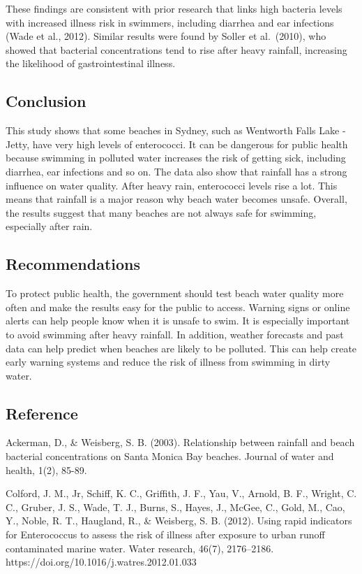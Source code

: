 \documentclass[
  11pt,
]{article}
\begin{document}
These findings are consistent with prior research that links high
bacteria levels with increased illness risk in swimmers, including
diarrhea and ear infections (Wade et al., 2012). Similar results were
found by Soller et al.~(2010), who showed that bacterial concentrations
tend to rise after heavy rainfall, increasing the likelihood of
gastrointestinal illness.

\subsection{Conclusion}\label{conclusion}

This study shows that some beaches in Sydney, such as Wentworth Falls
Lake - Jetty, have very high levels of enterococci. It can be dangerous
for public health because swimming in polluted water increases the risk
of getting sick, including diarrhea, ear infections and so on. The data
also show that rainfall has a strong influence on water quality. After
heavy rain, enterococci levels rise a lot. This means that rainfall is a
major reason why beach water becomes unsafe. Overall, the results
suggest that many beaches are not always safe for swimming, especially
after rain.

\subsection{Recommendations}\label{recommendations}

To protect public health, the government should test beach water quality
more often and make the results easy for the public to access. Warning
signs or online alerts can help people know when it is unsafe to swim.
It is especially important to avoid swimming after heavy rainfall. In
addition, weather forecasts and past data can help predict when beaches
are likely to be polluted. This can help create early warning systems
and reduce the risk of illness from swimming in dirty water.

\subsection{Reference}\label{reference}

Ackerman, D., \& Weisberg, S. B. (2003). Relationship between rainfall
and beach bacterial concentrations on Santa Monica Bay beaches. Journal
of water and health, 1(2), 85-89.

Colford, J. M., Jr, Schiff, K. C., Griffith, J. F., Yau, V., Arnold, B.
F., Wright, C. C., Gruber, J. S., Wade, T. J., Burns, S., Hayes, J.,
McGee, C., Gold, M., Cao, Y., Noble, R. T., Haugland, R., \& Weisberg,
S. B. (2012). Using rapid indicators for Enterococcus to assess the risk
of illness after exposure to urban runoff contaminated marine water.
Water research, 46(7), 2176--2186.
https://doi.org/10.1016/j.watres.2012.01.033
\end{document}
